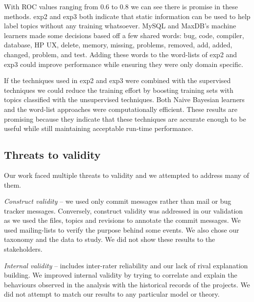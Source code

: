 \documentclass[]{sig-alternate}
\begin{document}
With ROC values ranging from $0.6$ to $0.8$ we can see there is promise in these methods.
\textsf{exp2} and \textsf{exp3} both indicate that static information can be used to help label topics without any training whatsoever. 
MySQL and MaxDB's machine learners made some decisions based off a few shared words: \textsf{bug, code, compiler, database, HP UX, delete, memory, missing, problems, removed, add, added, changed, problem, and test}. 
Adding these words to the word-lists of \textsf{exp2} and \textsf{exp3} could improve performance while ensuring they were only domain specific.

If the techniques used in \textsf{exp2} and \textsf{exp3} were combined with the supervised techniques we could reduce the training effort by boosting training sets with topics classified with the unsupervised techniques.
Both Naive Bayesian learners and the word-list approaches were computationally efficient.  
These results are promising because they indicate that these techniques are accurate enough to be useful while still maintaining acceptable run-time performance.


\subsection{Threats to validity}

Our work faced multiple threats to validity and we attempted to address many of them.

\emph{Construct validity} -- we used only commit messages rather than mail or bug tracker messages. 
Conversely, construct validity was addressed in our validation as we used the files, topics and revisions to annotate the commit messages. 
We used mailing-lists to verify the purpose behind some events.
We also chose our taxonomy and the data to study. We did not show these results to the stakeholders.

\emph{Internal validity} -- includes inter-rater reliability and our lack of rival explanation building. 
We improved internal validity by trying to correlate and explain the behaviours observed in the analysis with the historical records of the projects.
We did not attempt to match our results to any particular model or theory.
\end{document}
